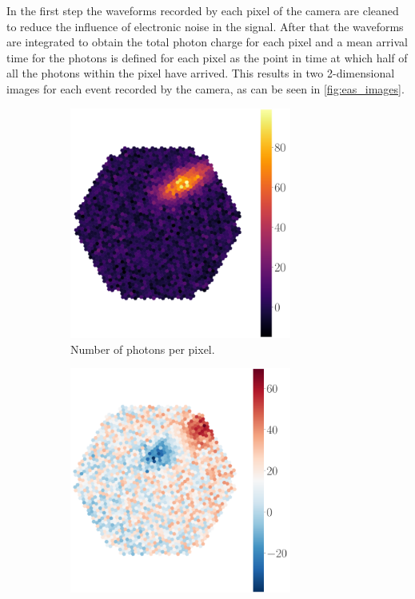 In the first step the waveforms recorded by each pixel of the camera are cleaned to reduce the influence of electronic noise in the signal.
After that the waveforms are integrated to obtain the total photon charge for each pixel and a mean arrival time for the photons is defined for each pixel 
as the point in time at which half of all the photons within the pixel have arrived.
This results in two 2-dimensional images for each event recorded by the camera, as can be seen in \autoref{fig:eas_images}.
\begin{figure}
    \centering
    \begin{subfigure}{0.49\textwidth}
        \centering
        \includegraphics[width=0.8\textwidth]{images/eas_image1.png}
        \caption{Number of photons per pixel.}
        \label{fig:eas_image1}
    \end{subfigure}
    \hfill
    \begin{subfigure}{0.49\textwidth}
        \centering
        \includegraphics[width=0.8\textwidth]{images/eas_image2.png}

\end{subfigure}
\end{figure}
